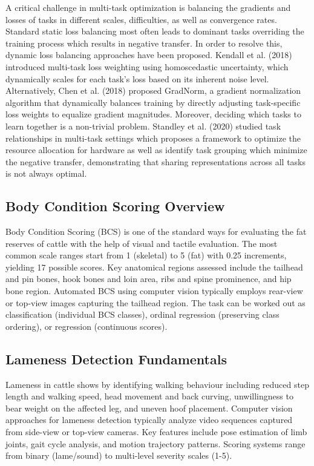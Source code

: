 A critical challenge in multi-task optimization is balancing the gradients and losses of tasks in different scales, difficulties, as well as convergence rates. Standard static loss balancing most often leads to dominant tasks overriding the training process which results in negative transfer. In order to resolve this, dynamic loss balancing approaches have been proposed. Kendall et al. (2018) \cite{kendall2018multi} introduced multi-task loss weighting using homoscedastic uncertainty, which dynamically scales for each task's loss based on its inherent noise level. Alternatively, Chen et al. (2018) \cite{chen2018gradnorm} proposed GradNorm, a gradient normalization algorithm that dynamically balances training by directly adjusting task-specific loss weights to equalize gradient magnitudes. Moreover, deciding which tasks to learn together is a non-trivial problem. Standley et al. (2020) \cite{standley2020tasks} studied task relationships in multi-task settings which proposes a framework to optimize the resource allocation for hardware as well as identify task grouping which minimize the negative transfer, demonstrating that sharing representations across all tasks is not always optimal.

\subsection{Body Condition Scoring Overview}

Body Condition Scoring (BCS) is one of the standard ways for evaluating the fat reserves of cattle with the help of visual and tactile evaluation. The most common scale ranges start from 1 (skeletal) to 5 (fat) with 0.25 increments, yielding 17 possible scores. Key anatomical regions assessed include the tailhead and pin bones, hook bones and loin area, ribs and spine prominence, and hip bone region. Automated BCS using computer vision typically employs rear-view or top-view images capturing the tailhead region. The task can be worked out as classification (individual BCS classes), ordinal regression (preserving class ordering), or regression (continuous scores).

\subsection{Lameness Detection Fundamentals}

Lameness in cattle shows by identifying walking behaviour including reduced step length and walking speed, head movement and back curving, unwillingness to bear weight on the affected leg, and uneven hoof placement. Computer vision approaches for lameness detection typically analyze video sequences captured from side-view or top-view cameras. Key features include pose estimation of limb joints, gait cycle analysis, and motion trajectory patterns. Scoring systems range from binary (lame/sound) to multi-level severity scales (1-5).

